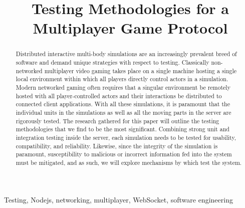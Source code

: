 \documentclass[conference]{IEEEtran}
\begin{document}
\title{Testing Methodologies for a Multiplayer Game Protocol\\
}

\author{
}

\maketitle

\begin{abstract}
 Distributed interactive multi-body simulations are an increasingly prevalent breed of software and demand unique strategies with respect to testing.
 Classically non-networked multiplayer video gaming takes place on a single machine hosting a single local environment within which all players directly
 control actors in a simulation. Modern networked gaming often requires that a singular environment be remotely hosted with all player-controlled actors and
 their interactions be distributed to connected client applications. With all these simulations, it is paramount that the individual units in the simulations
 as well as all the moving parts in the server are rigorously tested. The research gathered for this paper will outline the testing methodologies that we find
 to be the most significant. Combining strong unit and integration testing inside the server, each simulation needs to be tested for usability, compatibility, and
 reliability. Likewise, since the integrity of the simulation is paramount, susceptibility to malicious or incorrect information fed into the system  must be mitigated,
 and as such, we will explore mechanisms by which test the system.

\end{abstract}

\begin{IEEEkeywords}
Testing, Nodejs, networking, multiplayer, WebSocket, software engineering
\end{IEEEkeywords}
\end{document}
